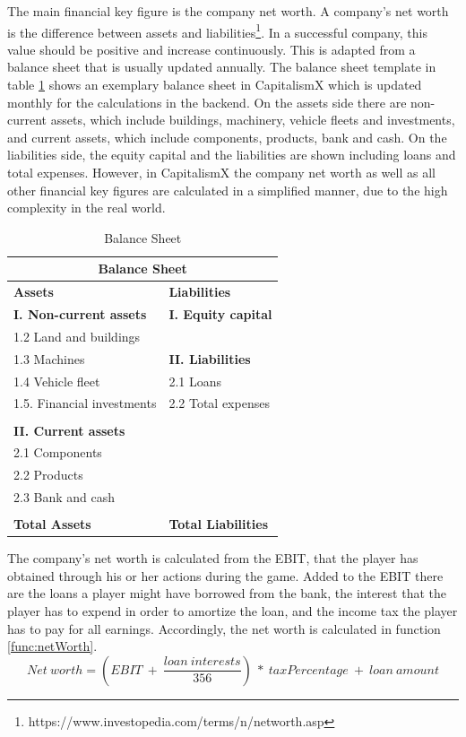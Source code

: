 The main financial key figure is the company net worth. A company's net worth is the difference between assets and liabilities\footnote{https://www.investopedia.com/terms/n/networth.asp}. In a successful company, this value should be positive and increase continuously. This is adapted from a balance sheet that is usually updated annually. The balance sheet template in table \ref{tab:BalanceSheet} shows an exemplary balance sheet in CapitalismX which is updated monthly for the calculations in the backend. On the assets side there are non-current assets, which include buildings, machinery, vehicle fleets and investments, and current assets, which include components, products, bank and cash. On the liabilities side, the equity capital and the liabilities are shown including loans and total expenses. However, in CapitalismX the company net worth as well as all other financial key figures are calculated in a simplified manner, due to the high complexity in the real world.

\begin{table}[ht]
\label{tab:BalanceSheet}
\begin{tabular}{|p{5.9cm}|p{5.9cm}|}
\hline
\multicolumn{2}{|c|}{\textbf{Balance Sheet}}\\
\hline \textbf{Assets} & \textbf{Liabilities}\\ 
\hline \textbf{I. Non-current assets} & \textbf{I. Equity capital}\\
\hline 1.2 Land and buildings &\\
\hline 1.3 Machines & \textbf{II. Liabilities}\\
\hline 1.4 Vehicle fleet & 2.1 Loans\\
\hline 1.5. Financial investments &  2.2 Total expenses\\
\hline &\\
\hline \textbf{II. Current assets} &\\
\hline 2.1 Components &\\
\hline 2.2 Products &\\
\hline 2.3 Bank and cash &\\
\hline &\\
\hline \textbf{Total Assets} & \textbf{Total Liabilities}\\
\hline
\end{tabular}
\caption{Balance Sheet}
\end{table}

The company’s net worth %
is calculated from the EBIT, that the player has obtained through his or her actions during the game. Added to the EBIT there are the loans a player might have borrowed from the bank, the interest that the player has to expend in order to amortize the loan, and the income tax the player has to pay for all earnings. Accordingly, the net worth is calculated in  function \ref{func:netWorth}.
\begin{equation}
\label{func:netWorth}
    Net~worth = (EBIT~+~\frac{loan~interests}{356})~*~taxPercentage~+~loan~amount
\end{equation}

